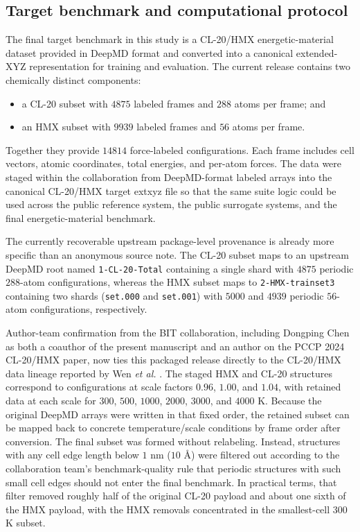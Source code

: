 \subsection{Target benchmark and computational protocol}
\label{sec:data}

The final target benchmark in this study is a CL-20/HMX energetic-material dataset provided in DeepMD format and converted into a canonical extended-XYZ representation for training and evaluation. The current release contains two chemically distinct components:
\begin{itemize}
    \item a CL-20 subset with $4875$ labeled frames and $288$ atoms per frame; and
    \item an HMX subset with $9939$ labeled frames and $56$ atoms per frame.
\end{itemize}
Together they provide $14814$ force-labeled configurations. Each frame includes cell vectors, atomic coordinates, total energies, and per-atom forces. The data were staged within the collaboration from DeepMD-format labeled arrays into the canonical CL-20/HMX target extxyz file so that the same suite logic could be used across the public reference system, the public surrogate systems, and the final energetic-material benchmark.

The currently recoverable upstream package-level provenance is already more specific than an anonymous source note. The CL-20 subset maps to an upstream DeepMD root named \texttt{1-CL-20-Total} containing a single shard with $4875$ periodic $288$-atom configurations, whereas the HMX subset maps to \texttt{2-HMX-trainset3} containing two shards (\texttt{set.000} and \texttt{set.001}) with $5000$ and $4939$ periodic $56$-atom configurations, respectively.

Author-team confirmation from the BIT collaboration, including Dongping Chen as both a coauthor of the present manuscript and an author on the PCCP 2024 CL-20/HMX paper, now ties this packaged release directly to the CL-20/HMX data lineage reported by Wen \emph{et al.} \cite{wen2024pccp}. The staged HMX and CL-20 structures correspond to configurations at scale factors $0.96$, $1.00$, and $1.04$, with retained data at each scale for $300$, $500$, $1000$, $2000$, $3000$, and $4000$ K. Because the original DeepMD arrays were written in that fixed order, the retained subset can be mapped back to concrete temperature/scale conditions by frame order after conversion. The final subset was formed without relabeling. Instead, structures with any cell edge length below $1$ nm ($10$ \AA{}) were filtered out according to the collaboration team's benchmark-quality rule that periodic structures with such small cell edges should not enter the final benchmark. In practical terms, that filter removed roughly half of the original CL-20 payload and about one sixth of the HMX payload, with the HMX removals concentrated in the smallest-cell $300$ K subset.


